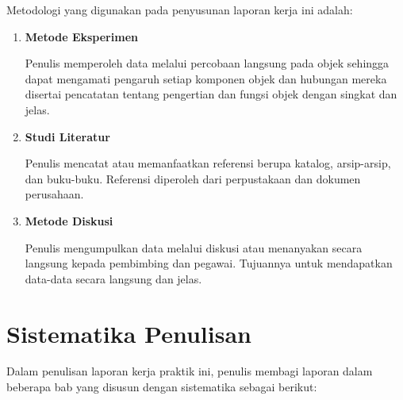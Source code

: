 Metodologi yang digunakan pada penyusunan laporan kerja ini adalah:
\vspace{0.5ex}

\begin{enumerate}[nolistsep]

  \item \textbf{Metode Eksperimen}
  \vspace{0.5ex}

  Penulis memperoleh data melalui percobaan langsung pada objek sehingga dapat mengamati pengaruh setiap komponen objek dan hubungan mereka disertai pencatatan tentang pengertian dan fungsi objek dengan singkat dan jelas.
  \vspace{0.5ex}

  \item \textbf{Studi Literatur}
  \vspace{0.5ex}

  Penulis mencatat atau memanfaatkan referensi berupa katalog, arsip-arsip, dan buku-buku. Referensi diperoleh dari perpustakaan dan dokumen perusahaan.
  \vspace{0.5ex}

  \item \textbf{Metode Diskusi}
  \vspace{0.5ex}

  Penulis mengumpulkan data melalui diskusi atau menanyakan secara langsung kepada pembimbing dan pegawai.
  Tujuannya untuk mendapatkan data-data secara langsung dan jelas.
  \vspace{0.5ex}

\end{enumerate}
\vspace{0.5ex}

\section{Sistematika Penulisan}
\vspace{1ex}

Dalam penulisan laporan kerja praktik ini, penulis membagi laporan dalam beberapa bab yang disusun dengan sistematika sebagai berikut:
\vspace{0.5ex}

